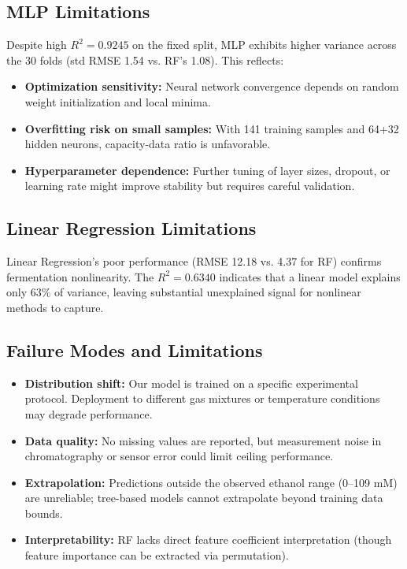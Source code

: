 \documentclass[conference]{IEEEtran}
\begin{document}
\subsection{MLP Limitations}
Despite high $R^2 = 0.9245$ on the fixed split, MLP exhibits higher variance across the 30 folds (std RMSE 1.54 vs. RF's 1.08). This reflects:
\begin{itemize}
\item \textbf{Optimization sensitivity:} Neural network convergence depends on random weight initialization and local minima.
\item \textbf{Overfitting risk on small samples:} With 141 training samples and 64+32 hidden neurons, capacity-data ratio is unfavorable.
\item \textbf{Hyperparameter dependence:} Further tuning of layer sizes, dropout, or learning rate might improve stability but requires careful validation.
\end{itemize}

\subsection{Linear Regression Limitations}
Linear Regression's poor performance (RMSE 12.18 vs. 4.37 for RF) confirms fermentation nonlinearity. The $R^2 = 0.6340$ indicates that a linear model explains only 63\% of variance, leaving substantial unexplained signal for nonlinear methods to capture.

\subsection{Failure Modes and Limitations}
\begin{itemize}
\item \textbf{Distribution shift:} Our model is trained on a specific experimental protocol. Deployment to different gas mixtures or temperature conditions may degrade performance.
\item \textbf{Data quality:} No missing values are reported, but measurement noise in chromatography or sensor error could limit ceiling performance.
\item \textbf{Extrapolation:} Predictions outside the observed ethanol range (0–109 mM) are unreliable; tree-based models cannot extrapolate beyond training data bounds.
\item \textbf{Interpretability:} RF lacks direct feature coefficient interpretation (though feature importance can be extracted via permutation).
\end{itemize}
\end{document}
